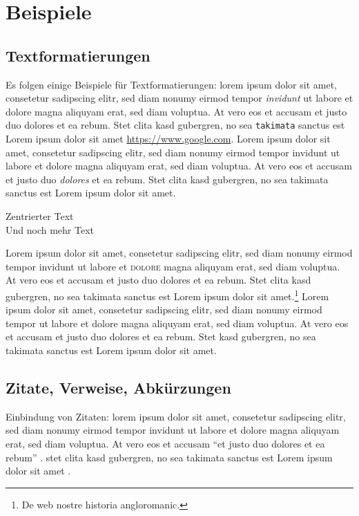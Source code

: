 \chapter{Beispiele}\label{ch:beispiele}
\lipsum[1]

\section{Textformatierungen}\label{sec:textformatierungen}

Es folgen einige Beispiele für Textformatierungen: lorem ipsum dolor sit amet, consetetur sadipscing elitr, sed diam nonumy eirmod tempor \emph{invidunt} ut labore et dolore magna aliquyam erat, sed diam voluptua. At vero eos et accusam et justo duo dolores et ea rebum. Stet clita kasd gubergren, no sea \texttt{takimata} sanctus est Lorem ipsum dolor sit amet \url{https://www.google.com}. Lorem ipsum dolor sit amet, consetetur sadipscing elitr, sed diam nonumy eirmod tempor invidunt ut labore et dolore magna aliquyam erat, sed diam voluptua. At vero eos et accusam et justo duo \textit{dolores} et ea rebum. Stet clita kasd gubergren, no sea takimata sanctus est Lorem ipsum dolor sit amet.

\begin{center}
Zentrierter Text \\
Und noch mehr Text \\
\end{center}

Lorem ipsum dolor sit amet, consetetur sadipscing elitr, sed diam nonumy eirmod tempor invidunt ut labore et \textsc{dolore} magna aliquyam erat, sed diam voluptua. At vero eos et accusam et justo duo dolores et ea rebum. Stet clita kasd gubergren, no sea takimata sanctus est Lorem ipsum dolor sit amet.\footnote{De web nostre historia angloromanic.} Lorem ipsum dolor sit amet, consetetur sadipscing elitr, sed diam nonumy eirmod tempor  ut labore et dolore magna aliquyam erat, sed diam voluptua. At vero eos et accusam et justo duo dolores et ea rebum. Stet  kasd gubergren, no sea takimata sanctus est Lorem ipsum dolor sit amet.

\section{Zitate, Verweise, Abkürzungen}

Einbindung von Zitaten: lorem ipsum dolor sit amet, consetetur sadipscing elitr, sed diam nonumy eirmod tempor invidunt ut labore et dolore magna aliquyam erat, sed diam voluptua. At vero eos et accusam ``et justo duo dolores et ea rebum'' \cite{AB00}. \cite{AB00} \cite{ABC01} stet clita kasd gubergren, no sea takimata sanctus est Lorem ipsum dolor sit amet \cite{Az09} \cite{Ez10} \cite{Gl06} \cite{GI14} \cite{Wa14} \cite{XX14} \cite{Wa14b}.

